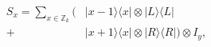 \begin{equation}
\begin{aligned}
S_x = \sum_{x \in \mathbb{Z}_k} \Big( &|x-1\rangle\langle x| \otimes |L\rangle\langle L| \\
+ &|x+1\rangle\langle x| \otimes |R\rangle\langle R| \Big) \otimes I_y,
\end{aligned}
\label{eq:shift_x}
\end{equation}
